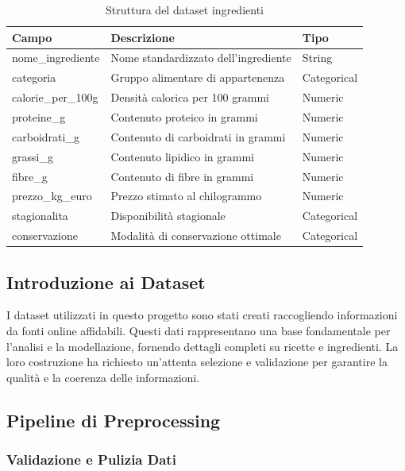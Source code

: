 \documentclass[12pt,a4paper]{article}
\begin{document}
\begin{table}[H]
\centering
\begin{tabular}{@{}lp{7cm}l@{}}
\toprule
\textbf{Campo} & \textbf{Descrizione} & \textbf{Tipo} \\
\midrule
nome\_ingrediente & Nome standardizzato dell'ingrediente & String \\
categoria & Gruppo alimentare di appartenenza & Categorical \\
calorie\_per\_100g & Densità calorica per 100 grammi & Numeric \\
proteine\_g & Contenuto proteico in grammi & Numeric \\
carboidrati\_g & Contenuto di carboidrati in grammi & Numeric \\
grassi\_g & Contenuto lipidico in grammi & Numeric \\
fibre\_g & Contenuto di fibre in grammi & Numeric \\
prezzo\_kg\_euro & Prezzo stimato al chilogrammo & Numeric \\
stagionalita & Disponibilità stagionale & Categorical \\
conservazione & Modalità di conservazione ottimale & Categorical \\
\bottomrule
\end{tabular}
\caption{Struttura del dataset ingredienti}
\label{tab:ingredienti_structure}
\end{table}

\subsection{Introduzione ai Dataset}

I dataset utilizzati in questo progetto sono stati creati raccogliendo informazioni da fonti online affidabili. Questi dati rappresentano una base fondamentale per l'analisi e la modellazione, fornendo dettagli completi su ricette e ingredienti. La loro costruzione ha richiesto un'attenta selezione e validazione per garantire la qualità e la coerenza delle informazioni.

\subsection{Pipeline di Preprocessing}

\subsubsection{Validazione e Pulizia Dati}
\end{document}
